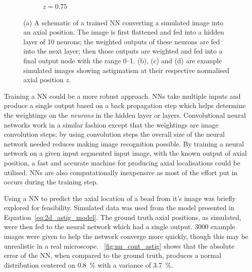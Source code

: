 \begin{figure}
\begin{subfigure}[t]{0.2\linewidth}
        \caption{\(z=0.75\)}
    \end{subfigure}
    \caption{
    (a) A schematic of a trained \gls{NN} converting a simulated image into an axial position.
    The image is first flattened and fed into a hidden layer of 10 neurons;
    the weighted outputs of these neurons are fed into the next layer;
    then those outputs are weighted and fed into a final output node with the range \SIrange{0}{1}{}.
    (b), (c) and (d) are example simulated images showing astigmatism at their respective normalised axial position \(z\).
    }\label{}
\end{figure}

Training a \gls{NN} could be a more robust approach.
\gls{NN}s take multiple inputs and produce a single output based on a back propagation step which helps determine the weightings on the \emph{neurons} in the hidden layer or layers.
Convolutional neural networks work in a similar fashion except that the weightings are image convolution steps; by using convolution steps the overall size of the neural network needed reduces making image recognition possible.
By training a neural network on a given input segmented input image, with the known output of axial position, a fast and accurate machine for producing axial localisations could be utilised.
\gls{NN}s are also computationally inexpensive as most of the effort put in occurs during the training step.

Using a \gls{NN} to predict the axial location of a bead from it's image was briefly explored for feasibility.
Simulated data was used from the model presented in Equation~\eqref{eq:2d_astig_model}.
The ground truth axial positions, as simulated, were then fed to the neural network which had a single output.
3000 example images were given to help the network converge more quickly, though this may be unrealistic in a real microscope.
\figurename~\ref{fig:nn_cont_astig} shows that the absolute error of the \gls{NN}, when compared to the ground truth, produces a normal distribution centered on \SI{0.8}{\percent} with a variance of \SI{3.7}{\percent}.

